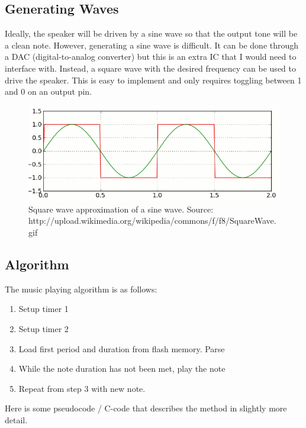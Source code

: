\documentclass[11pt]{article}
\begin{document}
\subsection{Generating Waves}

Ideally, the speaker will be driven by a sine wave so that the output tone will be a clean note. However, generating a sine wave is difficult. It can be done through a DAC (digital-to-analog converter) but this is an extra IC that I would need to interface with. Instead, a square wave with the desired frequency can be used to drive the speaker. This is easy to implement and only requires toggling between 1 and 0 on an output pin. \\

\begin{figure}[h!]
\centering
\includegraphics[scale=0.6]{square.png}
\caption{Square wave approximation of a sine wave. Source: http://upload.wikimedia.org/wikipedia/commons/f/f8/SquareWave.gif}
\label{fig:square}
\end{figure} 


\subsection{Algorithm}

The music playing algorithm is as follows:

\begin{enumerate}
	\item Setup timer 1
	\item Setup timer 2
	\item Load first period and duration from flash memory. Parse
	\item While the note duration has not been met, play the note
	\item Repeat from step 3 with new note.
\end{enumerate}

Here is some pseudocode / C-code that describes the method in slightly more detail.
\end{document}
